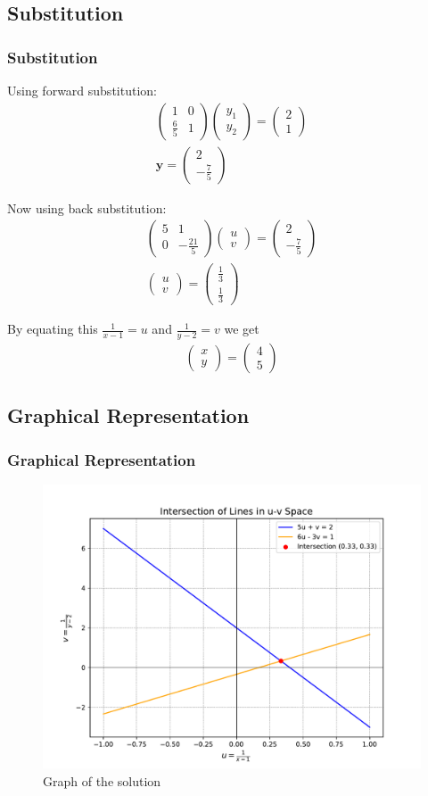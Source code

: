 \documentclass{beamer}
\theoremstyle{remark}
\newcommand{\myvec}[1]{\ensuremath{\begin{pmatrix}#1\end{pmatrix}}}
\let\vec\mathbf
\numberwithin{equation}{section}
\begin{document}
\subsection{Substitution}
\begin{frame}
\frametitle{Substitution}
Using forward substitution:
\begin{align}
    \myvec{1 & 0\\\frac{6}{5} & 1}\myvec{y_1\\y_2} = \myvec{2\\1}\\
	\vec{y}= \myvec{2\\-\frac{7}{5}}
\end{align}

Now using back substitution:
\begin{align}
    \myvec{5 & 1\\0 & -\frac{21}{5}}\myvec{u\\v} = \myvec{2\\-\frac{7}{5}}\\
	\myvec{u\\v} =\myvec{\frac{1}{3}\\\frac{1}{3}} 
\end{align}

By equating this $\frac{1}{x-1} = u$ and $\frac{1}{y-2} = v$ we get
\begin{align}
    \myvec{x\\y} = \myvec{4\\5}
\end{align}
\end{frame}
\subsection{Graphical Representation}
\begin{frame}
\frametitle{Graphical Representation}
\begin{figure}[h!]
   \centering
   \includegraphics[width=0.9\linewidth]{figs/fig.pdf}
   \caption{Graph of the solution}
\end{figure}
\end{frame}
\end{document}
